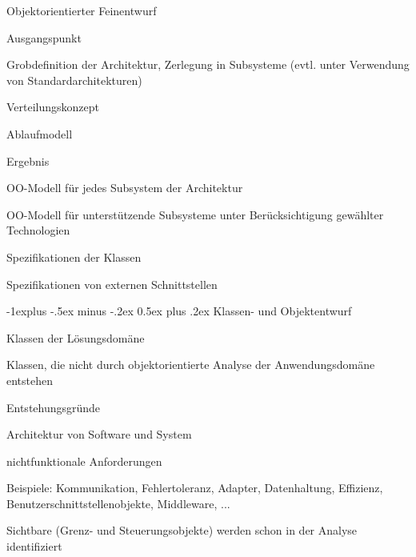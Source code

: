 \documentclass[a4paper]{article}
\makeatletter
\renewcommand{\subsection}{\@startsection{subsection}{2}{0mm}%
                                {-1explus -.5ex minus -.2ex}%
                                {0.5ex plus .2ex}%
                                {\normalfont\normalsize\bfseries}}
\makeatother
\begin{document}
\begin{multicols}{3}
  Objektorientierter Feinentwurf
  \begin{itemize*}
    \item Ausgangspunkt
    \begin{itemize*}
      \item Grobdefinition der Architektur, Zerlegung in Subsysteme (evtl. unter Verwendung von Standardarchitekturen)
      \item Verteilungskonzept
      \item Ablaufmodell
    \end{itemize*}
    \item Ergebnis
    \begin{itemize*}
      \item OO-Modell für jedes Subsystem der Architektur
      \item OO-Modell für unterstützende Subsysteme unter Berücksichtigung gewählter Technologien
      \item Spezifikationen der Klassen
      \item Spezifikationen von externen Schnittstellen
    \end{itemize*}
  \end{itemize*}

  \subsection{Klassen- und Objektentwurf}
  \begin{itemize*}
    \item Klassen der Lösungsdomäne
    \begin{itemize*}
      \item Klassen, die nicht durch objektorientierte Analyse der Anwendungsdomäne entstehen
    \end{itemize*}
    \item Entstehungsgründe
    \begin{itemize*}
      \item Architektur von Software und System
      \item nichtfunktionale Anforderungen
      \item Beispiele: Kommunikation, Fehlertoleranz, Adapter, Datenhaltung, Effizienz, Benutzerschnittstellenobjekte, Middleware, ...
      \item Sichtbare (Grenz- und Steuerungsobjekte) werden schon in der Analyse identifiziert
    \end{itemize*}
  \end{itemize*}


\end{multicols}
\end{document}
